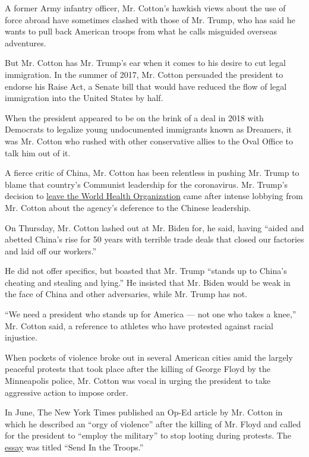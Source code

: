 A former Army infantry officer, Mr. Cotton's hawkish views about the use
of force abroad have sometimes clashed with those of Mr. Trump, who has
said he wants to pull back American troops from what he calls misguided
overseas adventures.

But Mr. Cotton has Mr. Trump's ear when it comes to his desire to cut
legal immigration. In the summer of 2017, Mr. Cotton persuaded the
president to endorse his Raise Act, a Senate bill that would have
reduced the flow of legal immigration into the United States by half.

When the president appeared to be on the brink of a deal in 2018 with
Democrats to legalize young undocumented immigrants known as Dreamers,
it was Mr. Cotton who rushed with other conservative allies to the Oval
Office to talk him out of it.

A fierce critic of China, Mr. Cotton has been relentless in pushing Mr.
Trump to blame that country's Communist leadership for the coronavirus.
Mr. Trump's decision to
\href{https://www.nytimes3xbfgragh.onion/2020/07/07/us/politics/coronavirus-trump-who.html}{leave
the World Health Organization} came after intense lobbying from Mr.
Cotton about the agency's deference to the Chinese leadership.

On Thursday, Mr. Cotton lashed out at Mr. Biden for, he said, having
``aided and abetted China's rise for 50 years with terrible trade deals
that closed our factories and laid off our workers.''

He did not offer specifics, but boasted that Mr. Trump ``stands up to
China's cheating and stealing and lying.'' He insisted that Mr. Biden
would be weak in the face of China and other adversaries, while Mr.
Trump has not.

``We need a president who stands up for America --- not one who takes a
knee,'' Mr. Cotton said, a reference to athletes who have protested
against racial injustice.

When pockets of violence broke out in several American cities amid the
largely peaceful protests that took place after the killing of George
Floyd by the Minneapolis police, Mr. Cotton was vocal in urging the
president to take aggressive action to impose order.

In June, The New York Times published an Op-Ed article by Mr. Cotton in
which he described an ``orgy of violence'' after the killing of Mr.
Floyd and called for the president to ``employ the military'' to stop
looting during protests. The
\href{https://www.nytimes3xbfgragh.onion/2020/06/03/opinion/tom-cotton-protests-military.html}{essay}
was titled ``Send In the Troops.''

